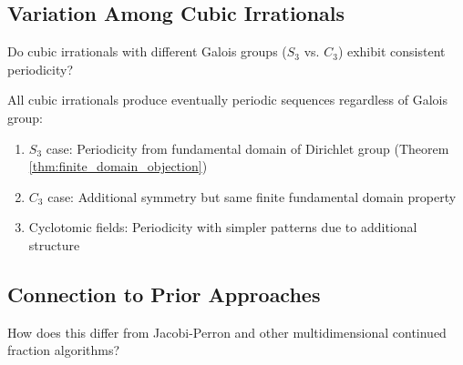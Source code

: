 \subsection{Variation Among Cubic Irrationals}

\begin{objection}
Do cubic irrationals with different Galois groups ($S_3$ vs. $C_3$) exhibit consistent periodicity?
\end{objection}

\begin{response}
All cubic irrationals produce eventually periodic sequences regardless of Galois group:
\begin{enumerate}
\item $S_3$ case: Periodicity from fundamental domain of Dirichlet group (Theorem \ref{thm:finite_domain_objection})
\item $C_3$ case: Additional symmetry but same finite fundamental domain property
\item Cyclotomic fields: Periodicity with simpler patterns due to additional structure
\end{enumerate}
\end{response}

\subsection{Connection to Prior Approaches}

\begin{objection}
How does this differ from Jacobi-Perron and other multidimensional continued fraction algorithms?
\end{objection}

